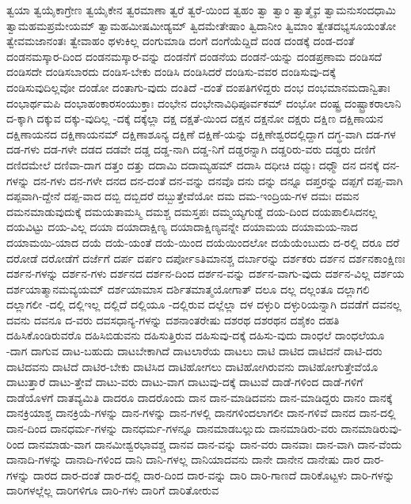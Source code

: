 {ತ್ವಯಾ
ತ್ವಯೈಕಾಗ್ರೇಣ
ತ್ವಯೈಕೇನ
ತ್ವರಮಾಣಾ
ತ್ವರೆ
ತ್ವರೆ-ಯಿಂದ
ತ್ವಹಂ
ತ್ವಾ
ತ್ವಾಂ
ತ್ವಾತ್ಮೈವ
ತ್ವಾಮನುಸಂದಧಾಮಿ
ತ್ವಾಮಹಮಪ್ರಮೇಯಮ್
ತ್ವಾಮಹಮೀಷಮೀಡ್ಯಮ್
ತ್ವಿದಮೇತೇಷಾಂ
ತ್ವಿದಾನೀಂ
ತ್ವಿಮಾಂ
ತ್ವೇತದಭ್ಯಸೂಯಂತೋ
ತ್ವೇವಮಜಾನಂತಃ
ತ್ವೇವಾಹಂ
ಥಳುಕಿಲ್ಲ
ದಂಗುಮಾಡಿ
ದಂಗೆ
ದಂಗೆಯೆದ್ದಿದೆ
ದಂಡ
ದಂಡಕ್ಕೆ
ದಂಡ-ದಂತೆ
ದಂಡನಮಸ್ಕಾರ-ದಿಂದ
ದಂಡನಮಸ್ಕಾರ-ವನ್ನು
ದಂಡನೆಗೆ
ದಂಡನೆಯ
ದಂಡನೆ-ಯನ್ನು
ದಂಡಪ್ರಣಾಮ
ದಂಡಿಸದೆ
ದಂಡಿಸದೇ
ದಂಡಿಸಬಾರದು
ದಂಡಿಸ-ಬೇಕು
ದಂಡಿಸಿ
ದಂಡಿಸಿದರೆ
ದಂಡಿಸು-ವವರ
ದಂಡಿಸುವು-ದಕ್ಕೆ
ದಂಡಿಸುವುದಿಲ್ಲವೋ
ದಂಡೋ
ದಂತಾಗು-ವುದು
ದಂತಿದೆ
-ದಂತೆ
ದಂಪತಿಗಳಿದ್ದರು
ದಂಭ
ದಂಭಮಾನಮದಾನ್ವಿತಾಃ
ದಂಭಾರ್ಥಮಪಿ
ದಂಭಾಹಂಕಾರಸಂಯುಕ್ತಾಃ
ದಂಭೇನ
ದಂಭೇನಾವಿಧಿಪೂರ್ವಕಮ್
ದಂಭೋ
ದಂಷ್ಟ್ರ
ದಂಷ್ಟ್ರಾಕರಾಲಾನಿ
ದ-ಕ್ಕಾಗಿ
ದಕ್ಕುವ
ದಕ್ಕು-ವುದಿಲ್ಲ
-ದಕ್ಕೆ
ದಕ್ಕೆಲ್ಲಾ
ದಕ್ಷ
ದಕ್ಷತೆ-ಯಿಂದ
ದಕ್ಷನ
ದಕ್ಷನೋ
ದಕ್ಷರು
ದಕ್ಷಿಣ
ದಕ್ಷಿಣಾಯನ
ದಕ್ಷಿಣಾಯನದ
ದಕ್ಷಿಣಾಯನಮ್
ದಕ್ಷಿಣಾಶೂನ್ಯ
ದಕ್ಷಿಣೆ
ದಕ್ಷಿಣೆ-ಯನ್ನು
ದಕ್ಷಿಣೇಶ್ವರದಲ್ಲಿದ್ದಾಗ
ದಗ್ಧ-ವಾಗಿ
ದಡ-ಗಳ
ದಡ-ಗಳು
ದಡ-ಗಳೇ
ದಡದ
ದಡವೇ
ದಡ್ಡ
ದಡ್ಡ-ನಾಗಿ
ದಡ್ಡ-ನಿಗೆ
ದಡ್ಡರನ್ನಾಗಿ
ದಡ್ಡರಿರು-ವರು
ದಡ್ಡರು
ದಣಿಗೆ
ದಣಿದಮೇಲೆ
ದಣಿವಾ-ದಾಗ
ದತ್ತಂ
ದತ್ತು
ದದಾಮಿ
ದದಾಮ್ಯಹಮ್
ದದಾಸಿ
ದಧೀಚಿ
ದಧ್ಮುಃ
ದಧ್ಮೌ
ದನ
ದನಕ್ಕೆ
ದನ-ಗಳನ್ನು
ದನ-ಗಳು
ದನ-ಗಳೇ
ದನದ
ದನ-ದಂತೆ
ದನ-ವನ್ನು
ದನವೊ
ದನು
ದನ್ನು
ದನ್ನೂ
ದಪ್ತರನ್ನು
ದಪ್ಪಗೆ
ದಪ್ಪ-ವಾಗಿ
ದಪ್ಪವಾಗಿ-ದ್ದೇನೆ
ದಪ್ಪ-ವಾದ
ದಬ್ಬಿ
ದಬ್ಬಿದರೆ
ದಬ್ಬುತ್ತೇವೆಯೋ
ದಮ
ದಮ-ಇಂದ್ರಿಯ-ಗಳ
ದಮಃ
ದಮನ
ದಮನಮಾಡುವುದುಕ್ಕೆ
ದಮಯತಾಮಸ್ಮಿ
ದಮಶ್ಚ
ದಮಸ್ತಪಃ
ದಮ್ಮಯ್ಯಗುಡ್ಡೆ
ದಯ-ದಿಂದ
ದಯಪಾಲಿಸಿದನಲ್ಲ
ದಯವಿಟ್ಟು
ದಯ-ವಿಲ್ಲ
ದಯಾ
ದಯಾದಾಕ್ಷಿಣ್ಯ
ದಯಾದಾಕ್ಷಿಣ್ಯವನ್ನೇ
ದಯಾಮಯ
ದಯಾಮಯ-ನಾದ
ದಯಾಮಯಿ-ಯಾದ
ದಯೆ
ದಯೆ-ಯಂತೆ
ದಯೆ-ಯಿಂದ
ದಯೆಯಿಂದಲೋ
ದಯೆಯೆಂಬುದು
ದ-ರಲ್ಲಿ
ದರೂ
ದರೆ
ದರೋಡೆ
ದರೋಡೆಗೆ
ದರ್ಜೆಗೆ
ದರ್ಪ
ದರ್ಪಂ
ದರ್ಪೋಽತಿಮಾನಶ್ಚ
ದರ್ಬಾರನ್ನು
ದರ್ಶಕರು
ದರ್ಶನ
ದರ್ಶನಕಾಂಕ್ಷಿಣಃ
ದರ್ಶನ-ಗಳನ್ನು
ದರ್ಶನ-ಗಳು
ದರ್ಶನದ
ದರ್ಶನ-ದಿಂದ
ದರ್ಶನ-ವನ್ನು
ದರ್ಶನ-ವಾಗು-ವುದು
ದರ್ಶನ-ವಿಲ್ಲ
ದರ್ಶಯ
ದರ್ಶಯಾತ್ಮಾನಮವ್ಯಯಮ್
ದರ್ಶಯಾಮಾಸ
ದರ್ಶಿತಮಾತ್ಮಯೋಗಾತ್
ದಲೂ
ದಲ್ಲ
ದಲ್ಲಂತೂ
ದಲ್ಲಾಗಲಿ
ದಲ್ಲಾಗಲೀ
-ದಲ್ಲಿ
ದಲ್ಲಿಇಲ್ಲ
ದಲ್ಲಿದೆ
ದಲ್ಲಿಯೂ
-ದಲ್ಲಿರುವ
ದಲ್ಲೆಲ್ಲಾ
ದಳ
ದಳ್ಳುರಿ
ದಳ್ಳುರಿಯನ್ನಾಗಿ
ದವಡೆಗೆ
ದವನಲ್ಲ
ದವನು
ದವನೂ
ದ-ವರು
ದವಸಧಾನ್ಯ-ಗಳನ್ನು
ದಶನಾಂತರೇಷು
ದಶರಥ
ದಶರಥನ
ದಶೈಕಂ
ದಹತಿ
ದಹಿಸಿಕೊಂಡಿರುವರೊ
ದಹಿಸಿಬಿಡುವನು
ದಹಿಸುತ್ತಿರುವ
ದಹಿಸುವು-ದಕ್ಕೆ
ದಹಿಸು-ವುದು
ದಾಂಧಲೆ
ದಾಂಧಲೆಯೂ
-ದಾಗ
ದಾಗುವ
ದಾಟ-ಬಹುದು
ದಾಟಬೇಕಾಗಿದೆ
ದಾಟಲಾರೆಯ
ದಾಟಲು
ದಾಟಿ
ದಾಟಿದ
ದಾಟಿದನೆ
ದಾಟಿ-ದರು
ದಾಟಿದವನು
ದಾಟಿದೆ
ದಾಟಿರ-ಬೇಕು
ದಾಟಿಸಿದ
ದಾಟಿಹೋಗಲು
ದಾಟಿಹೋಗಿರುವನು
ದಾಟಿಹೋಗುತ್ತೇವೆಯೊ
ದಾಟುತ್ತಾರೆ
ದಾಟು-ತ್ತೇವೆ
ದಾಟು-ವರು
ದಾಟು-ವಾಗ
ದಾಟುವು-ದಕ್ಕೆ
ದಾಟುವೆ
ದಾಡೆ-ಗಳಿಂದ
ದಾಡೆ-ಗಳಿಗೆ
ದಾಡೆಯೊಳಗೆ
ದಾತವ್ಯಮಿತಿ
ದಾದರೂ
ದಾದರೊಂದು
ದಾನ
ದಾನ-ಮಾಡಿದವನು
ದಾನ-ಮಾಡಿದ್ದರು
ದಾನಂ
ದಾನಕ್ಕೆ
ದಾನಕ್ರಿಯಾಶ್ಚ
ದಾನಕ್ರಿಯೆ-ಗಳನ್ನು
ದಾನ-ಗಳನ್ನು
ದಾನ-ಗಳಲ್ಲಿ
ದಾನಗಳಿಂದಲಾಗಲೀ
ದಾನ-ಗಳಿವೆ
ದಾನದ
ದಾನ-ದಲ್ಲಿ
ದಾನ-ದಿಂದ
ದಾನಧರ್ಮ-ಗಳನ್ನು
ದಾನಧರ್ಮ-ಗಳನ್ನೂ
ದಾನಮಾಡಬಲ್ಲುದು
ದಾನಮಾಡಿರು-ವರು
ದಾನಮಾಡಿರುವು-ರಿಂದ
ದಾನಮಾಡು-ವಾಗ
ದಾನಮೀಶ್ವರಭಾವಶ್ಚ
ದಾನವ
ದಾನ-ವನ್ನು
ದಾನ-ವರು
ದಾನವಾಃ
ದಾನ-ವಾಗಿ
ದಾನ-ವೆಂದು
ದಾನಾದಿ-ಗಳನ್ನು
ದಾನಾದಿ-ಗಳಿಂದ
ದಾನಿ
ದಾನಿ-ಗಳಲ್ಲ
ದಾನಿಯಾದವನು
ದಾನೇ
ದಾನೇನ
ದಾನೇಷು
ದಾರ
ದಾರ-ಗಳನ್ನು
ದಾರದ
ದಾರ-ದಂತೆ
ದಾರ-ದಲ್ಲಿ
ದಾರ-ದಿಂದ
ದಾರ-ವನ್ನು
ದಾರಿ
ದಾರಿ-ಗಾಣದೆ
ದಾರಿಕೊಟ್ಟಳು
ದಾರಿ-ಗಳನ್ನು
ದಾರಿಗಳಲ್ಲೆಲ್ಲ
ದಾರಿಗಳಿಗೂ
ದಾರಿ-ಗಳು
ದಾರಿಗೆ
ದಾರಿತೋರುವ
}
